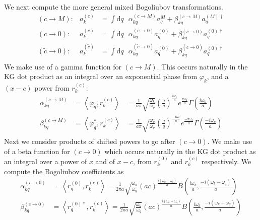 \documentclass[12pt,a4paper]{article}
\newcommand{\dv}[1]{\mathrm{d} #1 \text{ }}
\begin{document}
We next compute the more general mixed Bogoliubov transformations.
\begin{equation}
  \begin{array}{rll}
  (c \rightarrow M) : & a^{(c)}_k &= \int \dv{q} \alpha^{(c \rightarrow M)}_{kq} a^{M}_q + \beta^{(c \rightarrow M)}_{kq} a^{(M)\dagger}_q \\
  (c \rightarrow 0) : &   a^{(c)}_k &= \int \dv{q} \alpha^{(c \rightarrow 0)}_{kq} a^{(0)}_q + \beta^{(c \rightarrow 0)}_{kq} a^{(0)\dagger}_q \\
  (\widetilde{c} \rightarrow 0) : &   a^{(\tilde{c})}_k &= \int \dv{q} \alpha^{(\widetilde{c} \rightarrow 0)}_{kq} a^{(0)}_q + \beta^{(\widetilde{c} \rightarrow 0)}_{kq} a^{(0)\dagger}_q \\
  \end{array}
\end{equation}
We make use of a gamma function for $(c \rightarrow M)$. This occurs naturally in the KG dot product as an integral over an exponential phase from $\varphi_k$, and a $(x-c)$ power from $r_k^{(c)}$:
\begin{equation}
  \begin{array}{ccl}
    \alpha^{(c \rightarrow M)}_{kq} &= \left<\varphi_q, r_k^{(c)} \right> &= \frac{1}{a \pi} \sqrt{\frac{\omega_k}{\omega_q}} \left(\frac{a}{q}\right)^{\frac{i\omega_k}{a}} e^{\frac{\pi \omega_k}{a}} \Gamma\left(\frac{i\omega_k}{a}\right) \\
    \beta^{(c \rightarrow M)}_{kq} &= \left<\varphi_q^*, r_k^{(c)} \right> &= \frac{1}{a \pi} \sqrt{\frac{\omega_k}{\omega_q}} \left(\frac{a}{q}\right)^{\frac{-i\omega_k}{a}} e^{\frac{-\pi \omega_k}{a}} \Gamma\left(\frac{-i\omega_k}{a}\right) \\
  \end{array}
  \label{bogoCM}
\end{equation}
Next we consider products of shifted powers to go after $(c \rightarrow 0)$. We make use of a beta function for $(c \rightarrow 0)$ which occurs naturally in the KG dot product as an integral over a power of $x$ and of $x-c$, from $r_k^{(0)}$ and $r_k^{(c)}$ respectively.  We compute the Bogoliubov coefficients as
\begin{equation}
  \begin{aligned}
    \alpha^{(c \rightarrow 0)}_{kq} &= \left<r_q^{(0)}, r_k^{(c)} \right> = \frac{1}{2 \pi a}\sqrt{\frac{\omega_k}{\omega_q}} (ac)^{\frac{i(\omega_k - \omega_q)}{a}} B\left(\frac{i\omega_k}{a}, \frac{-i(\omega_k - \omega_q)}{a}\right) \\
    \beta^{(c \rightarrow 0)}_{kq} &= \left<r_q^{(0)*}, r_k^{(c)} \right> = \frac{1}{2 \pi a}\sqrt{\frac{\omega_k}{\omega_q}} (ac)^{\frac{i(\omega_k + \omega_q)}{a}} B\left(\frac{i\omega_k}{a}, \frac{-i(\omega_k + \omega_q)}{a}\right) \\
  \end{aligned}
  \label{bogoC0}
\end{equation}
\end{document}
